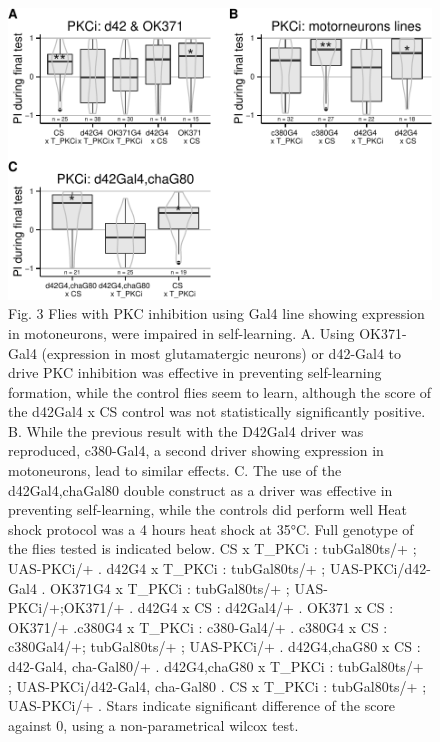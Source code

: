 \documentclass[]{article}
\begin{document}
\begin{figure}[htbp]
\centering
\includegraphics{firsttest_files/figure-latex/unnamed-chunk-4-1.pdf}
\caption{Fig. 3 Flies with PKC inhibition using Gal4 line showing
expression in motoneurons, were impaired in self-learning. A. Using
OK371-Gal4 (expression in most glutamatergic neurons) or d42-Gal4 to
drive PKC inhibition was effective in preventing self-learning
formation, while the control flies seem to learn, although the score of
the d42Gal4 x CS control was not statistically significantly positive.
B. While the previous result with the D42Gal4 driver was reproduced,
c380-Gal4, a second driver showing expression in motoneurons, lead to
similar effects. C. The use of the d42Gal4,chaGal80 double construct as
a driver was effective in preventing self-learning, while the controls
did perform well Heat shock protocol was a 4 hours heat shock at 35°C.
Full genotype of the flies tested is indicated below. CS x T\_PKCi :
tubGal80ts/+ ; UAS-PKCi/+ . d42G4 x T\_PKCi : tubGal80ts/+ ;
UAS-PKCi/d42-Gal4 . OK371G4 x T\_PKCi : tubGal80ts/+ ;
UAS-PKCi/+;OK371/+ . d42G4 x CS : d42Gal4/+ . OK371 x CS : OK371/+
.c380G4 x T\_PKCi : c380-Gal4/+ . c380G4 x CS : c380Gal4/+; tubGal80ts/+
; UAS-PKCi/+ . d42G4,chaG80 x CS : d42-Gal4, cha-Gal80/+ . d42G4,chaG80
x T\_PKCi : tubGal80ts/+ ; UAS-PKCi/d42-Gal4, cha-Gal80 . CS x T\_PKCi :
tubGal80ts/+ ; UAS-PKCi/+ . Stars indicate significant difference of the
score against 0, using a non-parametrical wilcox test.}
\end{figure}
\end{document}
